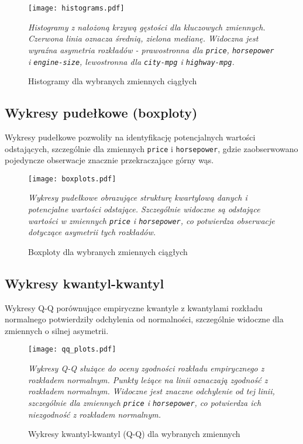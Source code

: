 \documentclass[12pt,a4paper]{article}
\begin{document}
\begin{figure}[H]
    \centering
    \texttt{[image: histograms.pdf]}
    \caption{Histogramy dla wybranych zmiennych ciągłych}
    \label{fig:histograms}
    \small\textit{Histogramy z nałożoną krzywą gęstości dla kluczowych zmiennych. Czerwona linia oznacza średnią, zielona medianę. Widoczna jest wyraźna asymetria rozkładów - prawostronna dla \texttt{price}, \texttt{horsepower} i \texttt{engine-size}, lewostronna dla \texttt{city-mpg} i \texttt{highway-mpg}.}
\end{figure}

\subsection{Wykresy pudełkowe (boxploty)}

Wykresy pudełkowe pozwoliły na identyfikację potencjalnych wartości odstających, szczególnie dla zmiennych \texttt{price} i \texttt{horsepower}, gdzie zaobserwowano pojedyncze obserwacje znacznie przekraczające górny wąs.

\begin{figure}[H]
    \centering
    \texttt{[image: boxplots.pdf]}
    \caption{Boxploty dla wybranych zmiennych ciągłych}
    \label{fig:boxplots}
    \small\textit{Wykresy pudełkowe obrazujące strukturę kwartylową danych i potencjalne wartości odstające. Szczególnie widoczne są odstające wartości w zmiennych \texttt{price} i \texttt{horsepower}, co potwierdza obserwacje dotyczące asymetrii tych rozkładów.}
\end{figure}

\subsection{Wykresy kwantyl-kwantyl}

Wykresy Q-Q porównujące empiryczne kwantyle z kwantylami rozkładu normalnego potwierdziły odchylenia od normalności, szczególnie widoczne dla zmiennych o silnej asymetrii.

\begin{figure}[H]
    \centering
    \texttt{[image: qq\_plots.pdf]}
    \caption{Wykresy kwantyl-kwantyl (Q-Q) dla wybranych zmiennych}
    \label{fig:qq_plots}
    \small\textit{Wykresy Q-Q służące do oceny zgodności rozkładu empirycznego z rozkładem normalnym. Punkty leżące na linii oznaczają zgodność z rozkładem normalnym. Widoczne jest znaczne odchylenie od tej linii, szczególnie dla zmiennych \texttt{price} i \texttt{horsepower}, co potwierdza ich niezgodność z rozkładem normalnym.}
\end{figure}
\end{document}
